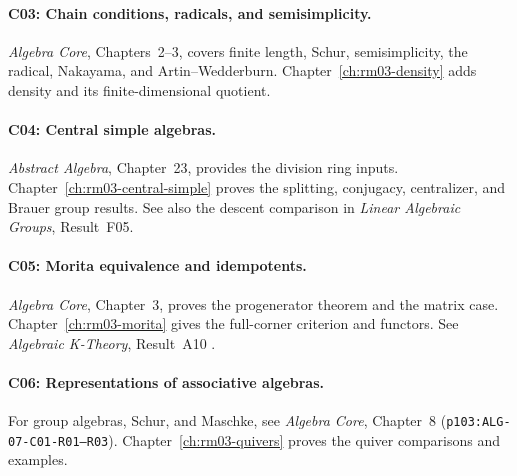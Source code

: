 \paragraph{C03: Chain conditions, radicals, and semisimplicity.}
\emph{Algebra Core}, Chapters~2--3, covers finite length, Schur,
semisimplicity, the radical, Nakayama, and Artin--Wedderburn.
Chapter~\ref{ch:rm03-density} adds density and its finite-dimensional quotient.

\paragraph{C04: Central simple algebras.}
\emph{Abstract Algebra}, Chapter~23, provides the division ring inputs.
Chapter~\ref{ch:rm03-central-simple} proves the splitting, conjugacy,
centralizer, and Brauer group results. See also the descent comparison
in \emph{Linear Algebraic Groups}, Result~F05.

\paragraph{C05: Morita equivalence and idempotents.}
\emph{Algebra Core}, Chapter~3, proves the progenerator theorem and
the matrix case. Chapter~\ref{ch:rm03-morita} gives the full-corner criterion
and functors. See \emph{Algebraic K-Theory}, Result~A10 \cite{ktheory}.

\paragraph{C06: Representations of associative algebras.}
For group algebras, Schur, and Maschke, see \emph{Algebra Core},
Chapter~8 (\texttt{p103:ALG-07-C01-R01--R03}).
Chapter~\ref{ch:rm03-quivers} proves the quiver comparisons and examples.
